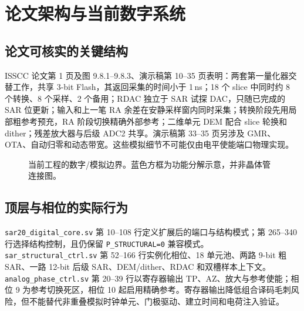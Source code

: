 \documentclass[UTF8,fontset=fandol,11pt,a4paper,openany]{ctexrep}
\newcommand{\code}[1]{\nolinkurl{#1}}
\begin{document}
\chapter{论文架构与当前数字系统}
\section{论文可核实的关键结构}
ISSCC 论文第 1 页及图 9.8.1--9.8.3、演示稿第 10--35 页表明：两套第一量化器交替工作，共享 3-bit Flash，其返回采集的时间小于 1\,ns；18 个 slice 中同时约 8 个转换、8 个采样、2 个备用；RDAC 独立于 SAR 试探 DAC，只随已完成的 SAR 位更新；输入和上一笔 RA 余差在安静采样窗内同时采集；转换阶段先用局部粗参考预充，RA 阶段切换精确外部参考；二维单元 DEM 配合 slice 轮换和 dither；残差放大器与后级 ADC2 共享。演示稿第 33--35 页另涉及 GMR、OTA、自动归零和动态带宽。这些模拟细节不可能仅由电平使能端口物理实现。

\begin{figure}[H]\centering
{}
\caption{当前工程的数字/模拟边界。蓝色方框为功能分解示意，并非晶体管连接图。}
\end{figure}

\section{顶层与相位的实际行为}
\code{sar20_digital_core.sv} 第 10--108 行定义扩展后的端口与结构模式；第 265--340 行选择结构控制，且仍保留 \code{P_STRUCTURAL=0} 兼容模式。\code{sar_structural_ctrl.sv} 第 52--166 行实例化相位、18 单元池、两路 9-bit 粗 SAR、一路 12-bit 后级 SAR、DEM/dither、RDAC 和双槽样本上下文。\code{analog_phase_ctrl.sv} 第 20--39 行以寄存器输出 TP、AZ、放大与参考使能；相位 9 为参考切换死区，相位 10 起启用精确参考。寄存器输出降低组合译码毛刺风险，但不能替代非重叠模拟时钟单元、门极驱动、建立时间和电荷注入验证。
\end{document}
